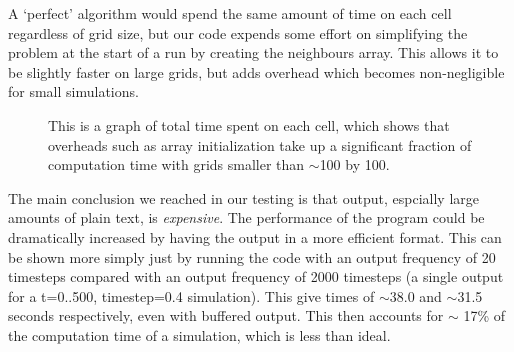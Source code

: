 	 A `perfect' algorithm would spend the same amount of time on each cell regardless of grid size, but our code expends some effort on simplifying the problem 
	 at the start of a run by creating the neighbours array. This allows it to be slightly faster on large grids, but adds overhead which becomes non-negligible 
	 for small simulations.  
	 
  \begin{figure}[H]
  
  \caption{\label{overhead}This is a graph of total time spent on each cell, which shows that overheads such as array initialization
  take up a significant fraction of computation time with grids smaller than $\sim$100 by 100.}
  \end{figure}
	 
   The main conclusion we reached in our testing is that output, espcially large amounts of plain text, is \emph{expensive}. The performance of
   the program could be dramatically increased by having the output in a more efficient format. This can be shown more simply just by running the 
   code with an output frequency of 20 timesteps compared with an output frequency of 2000 timesteps (a single output for a t=0..500, timestep=0.4
   simulation). This give times of $\sim$38.0 and $\sim$31.5 seconds respectively, even with buffered output. This then accounts for 
   $\sim$ 17\% of the computation time of a simulation, which is less than ideal.  \newline{}

